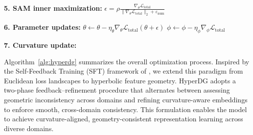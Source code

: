 \documentclass[10pt]{article} %
\begin{document}
\begin{algorithm}[t]
{  \textbf{5. SAM inner maximization:}\;
  $\epsilon =
  \rho \frac{\nabla_\theta \mathcal{L}_{\mathrm{total}}}
  {\|\nabla_\theta \mathcal{L}_{\mathrm{total}}\|_2 + \varepsilon_{\text{num}}}$\;

  \textbf{6. Parameter updates:}\;
  $\theta \leftarrow \theta - \eta_\theta 
  \nabla_\theta \mathcal{L}_{\mathrm{total}}(\theta+\epsilon)$\;
  $\phi \leftarrow \phi - \eta_\phi 
  \nabla_\phi \mathcal{L}_{\mathrm{total}}$\;

  \textbf{7. Curvature update:}\;

  \hrulefill
}
\end{algorithm}


Algorithm~\ref{alg:hyperdg} summarizes the overall optimization process. Inspired by the Self-Feedback Training (SFT) framework of \cite{li2025seeking}, we extend this paradigm from Euclidean loss landscapes to hyperbolic feature geometry. 
HyperDG adopts a two-phase feedback--refinement procedure that alternates between assessing geometric inconsistency across domains and refining curvature-aware embeddings to enforce smooth, cross-domain consistency. 
This formulation enables the model to achieve curvature-aligned, geometry-consistent representation learning across diverse domains. 
\end{document}
